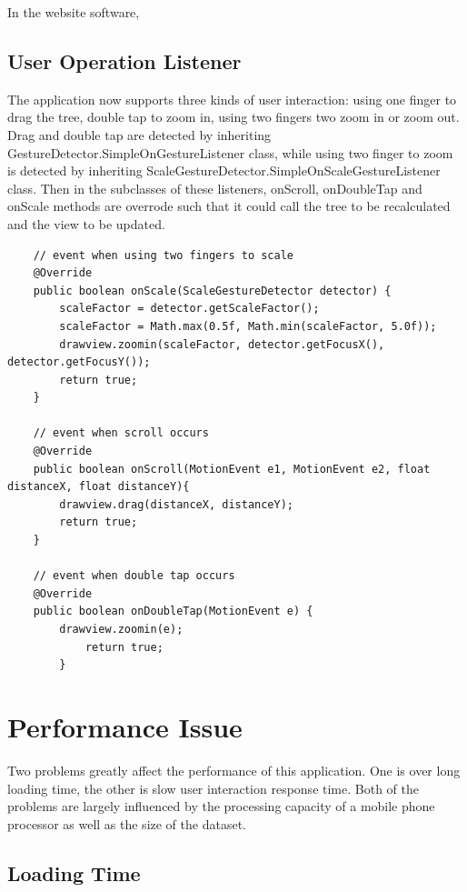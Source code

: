 \documentclass[MSc]{icldt}
\begin{document}
In the website software, 


\section{User Operation Listener}

The application now supports three kinds of user interaction: using one finger to drag the tree, double tap to zoom in, using two fingers two zoom in or zoom out. Drag and double tap are detected by inheriting GestureDetector.SimpleOnGestureListener class, while using two finger to zoom is detected by inheriting ScaleGestureDetector.SimpleOnScaleGestureListener class. Then in the subclasses of these listeners, onScroll, onDoubleTap and onScale methods are overrode such that it could call the tree to be recalculated and the view to be updated. 

\begin{lstlisting}
	// event when using two fingers to scale
	@Override
	public boolean onScale(ScaleGestureDetector detector) {
		scaleFactor = detector.getScaleFactor();
		scaleFactor = Math.max(0.5f, Math.min(scaleFactor, 5.0f));
		drawview.zoomin(scaleFactor, detector.getFocusX(), detector.getFocusY());
		return true;
	}
	
	// event when scroll occurs
	@Override
	public boolean onScroll(MotionEvent e1, MotionEvent e2, float distanceX, float distanceY){
		drawview.drag(distanceX, distanceY);
		return true;
	}
	
	// event when double tap occurs    
	@Override
	public boolean onDoubleTap(MotionEvent e) {
		drawview.zoomin(e);
    		return true;
        }

\end{lstlisting}

\chapter{Performance Issue}

Two problems greatly affect the performance of this application. One is over long loading time, the other is slow user interaction response time. Both of the problems are largely influenced by the processing capacity of a mobile phone processor as well as the size of the dataset. 

\section{Loading Time}
\end{document}
